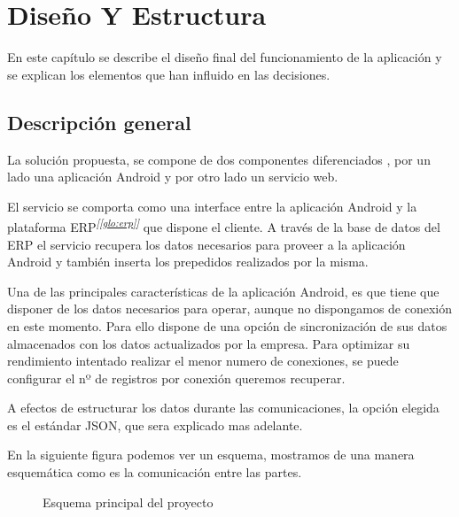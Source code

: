 \chapter{Diseño Y Estructura}

En este capítulo se describe el diseño final del funcionamiento de la aplicación y se explican los elementos que han influido en las decisiones.


\section{Descripción general}
La solución propuesta, se compone de dos componentes diferenciados , por un lado una aplicación Android y por otro lado un servicio web.

El servicio se comporta como una interface entre la aplicación Android y la plataforma ERP\textsuperscript{\textit{[\ref{glo:erp}]}} que dispone el cliente. A través de la base de datos del ERP el servicio recupera los datos necesarios para proveer a la aplicación Android y también inserta los prepedidos realizados por la misma.

Una de las principales características de la aplicación Android, es que tiene que disponer de los datos necesarios para operar, aunque no dispongamos de conexión en este momento. Para ello dispone de una opción de sincronización de sus datos almacenados con los datos actualizados por la empresa. Para optimizar su rendimiento intentado realizar el menor numero de conexiones, se puede configurar el nº de registros por conexión queremos recuperar.

A efectos de estructurar los datos durante las comunicaciones, la opción elegida es el estándar JSON, que sera explicado mas adelante. 

En la siguiente figura podemos ver un esquema, mostramos de una manera esquemática como es la comunicación entre las partes.

\begin{figure}[H]
	\centering
	\caption{Esquema principal del proyecto}
	\label{fig:esquema}
\end{figure}


